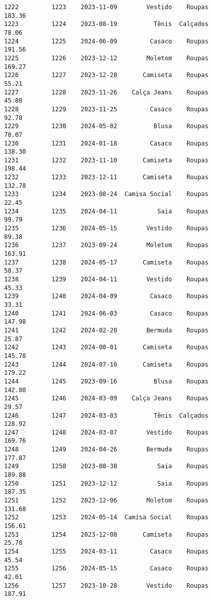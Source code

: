 \documentclass[11pt]{article}
\begin{document}
\begin{Verbatim}[commandchars=\\\{\}]
1222         1223    2023-11-09        Vestido    Roupas          183.36   
1223         1224    2023-08-19          Tênis  Calçados           78.06   
1224         1225    2024-06-09         Casaco    Roupas          191.56   
1225         1226    2023-12-12        Moletom    Roupas          169.27   
1226         1227    2023-12-28       Camiseta    Roupas           55.21   
1227         1228    2023-11-26    Calça Jeans    Roupas           45.80   
1228         1229    2023-11-25         Casaco    Roupas           92.78   
1229         1230    2024-05-02          Blusa    Roupas           70.07   
1230         1231    2024-01-18         Casaco    Roupas          138.30   
1231         1232    2023-11-10       Camiseta    Roupas          198.44   
1232         1233    2023-12-11       Camiseta    Roupas          132.78   
1233         1234    2023-08-24  Camisa Social    Roupas           22.45   
1234         1235    2024-04-11           Saia    Roupas           99.79   
1235         1236    2024-05-15        Vestido    Roupas           89.38   
1236         1237    2023-09-24        Moletom    Roupas          163.91   
1237         1238    2024-05-17       Camiseta    Roupas           58.37   
1238         1239    2024-04-11        Vestido    Roupas           45.33   
1239         1240    2024-04-09         Casaco    Roupas           33.31   
1240         1241    2024-06-03         Casaco    Roupas          147.98   
1241         1242    2024-02-20        Bermuda    Roupas           25.87   
1242         1243    2024-08-01       Camiseta    Roupas          145.78   
1243         1244    2024-07-10       Camiseta    Roupas          179.22   
1244         1245    2023-09-16          Blusa    Roupas          142.80   
1245         1246    2024-03-09    Calça Jeans    Roupas           29.57   
1246         1247    2024-03-03          Tênis  Calçados          128.92   
1247         1248    2024-03-07        Vestido    Roupas          169.76   
1248         1249    2024-04-26        Bermuda    Roupas          177.87   
1249         1250    2023-08-30           Saia    Roupas          189.88   
1250         1251    2023-12-12           Saia    Roupas          187.35   
1251         1252    2023-12-06        Moletom    Roupas          131.68   
1252         1253    2024-05-14  Camisa Social    Roupas          156.61   
1253         1254    2023-12-08       Camiseta    Roupas           25.78   
1254         1255    2024-03-11         Casaco    Roupas           45.54   
1255         1256    2024-05-15         Casaco    Roupas           42.01   
1256         1257    2023-10-28        Vestido    Roupas          187.91   

\end{Verbatim}
\end{document}
